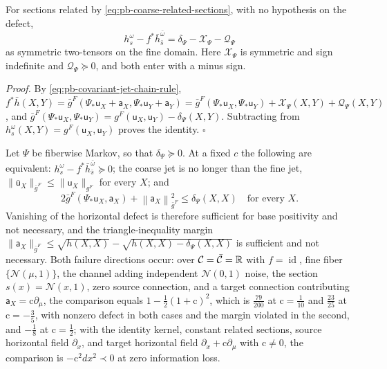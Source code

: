 For sections related by \eqref{eq:pb-coarse-related-sections}, with no hypothesis on the defect,
\begin{equation}
h_s^\omega-f^*\bar h_{\bar s}^{\bar\omega}
=\delta_\Psi-\mathcal X_\Psi-\mathcal Q_\Psi
\label{eq:pb-signed-base-comparison}
\end{equation}
as symmetric two-tensors on the fine domain. Here \(\mathcal X_\Psi\) is symmetric and sign
indefinite and \(\mathcal Q_\Psi\succeq0\), and both enter with a minus sign. 

\noindent\emph{Proof.}
By \eqref{eq:pb-covariant-jet-chain-rule},
\(f^*\bar h(X,Y)=\bar g^F(\Psi_*\mathsf u_X+\mathsf a_X,\Psi_*\mathsf u_Y+\mathsf a_Y)
=\bar g^F(\Psi_*\mathsf u_X,\Psi_*\mathsf u_Y)+\mathcal X_\Psi(X,Y)+\mathcal Q_\Psi(X,Y)\), and
\(\bar g^F(\Psi_*\mathsf u_X,\Psi_*\mathsf u_Y)=g^F(\mathsf u_X,\mathsf u_Y)-\delta_\Psi(X,Y)\).
Subtracting from \(h_s^\omega(X,Y)=g^F(\mathsf u_X,\mathsf u_Y)\) proves the identity.
\hfill$\square$

Let \(\Psi\) be fiberwise Markov, so that \(\delta_\Psi\succeq0\). At a fixed \(c\) the following are
equivalent: \(h_s^\omega-f^*\bar h_{\bar s}^{\bar\omega}\succeq0\); the coarse jet is no longer than the
fine jet, \(\lVert\bar{\mathsf u}_X\rVert_{\bar g^F}\leq\lVert\mathsf u_X\rVert_{g^F}\) for every
\(X\); and
\begin{equation}
2\bar g^F\left(\Psi_*\mathsf u_X,\mathsf a_X\right)
+\left\lVert\mathsf a_X\right\rVert^2_{\bar g^F}
\leq\delta_\Psi(X,X)
\quad\text{for every }X.
\label{eq:pb-positivity-criterion}
\end{equation}
Vanishing of the horizontal defect is therefore sufficient for base positivity and not necessary, and
the triangle-inequality margin
\(\lVert\mathsf a_X\rVert_{\bar g^F}\leq\sqrt{h(X,X)}-\sqrt{h(X,X)-\delta_\Psi(X,X)}\) is sufficient
and not necessary. Both failure directions occur: over \(\mathcal C=\bar{\mathcal C}=\mathbb R\) with
\(f=\operatorname{id}\), fine fiber \(\{\mathcal N(\mu,1)\}\), the channel adding independent
\(\mathcal N(0,1)\) noise, the section \(s(x)=\mathcal N(x,1)\), zero source connection, and a target
connection contributing \(\mathsf a_X=\mathrm c\partial_\mu\), the comparison equals
\(1-\tfrac12(1+\mathrm c)^2\), which is \(\tfrac{79}{200}\) at \(\mathrm c=\tfrac1{10}\) and
\(\tfrac{23}{25}\) at \(\mathrm c=-\tfrac35\), with nonzero defect in both cases and the margin violated
in the second, and \(-\tfrac18\) at \(\mathrm c=\tfrac12\); with the identity kernel, constant related
sections, source horizontal field \(\partial_x\), and target horizontal field
\(\partial_x+\mathrm c\partial_\mu\) with \(\mathrm c\ne0\), the comparison is
\(-\mathrm c^2dx^2\prec0\) at zero information loss. 


